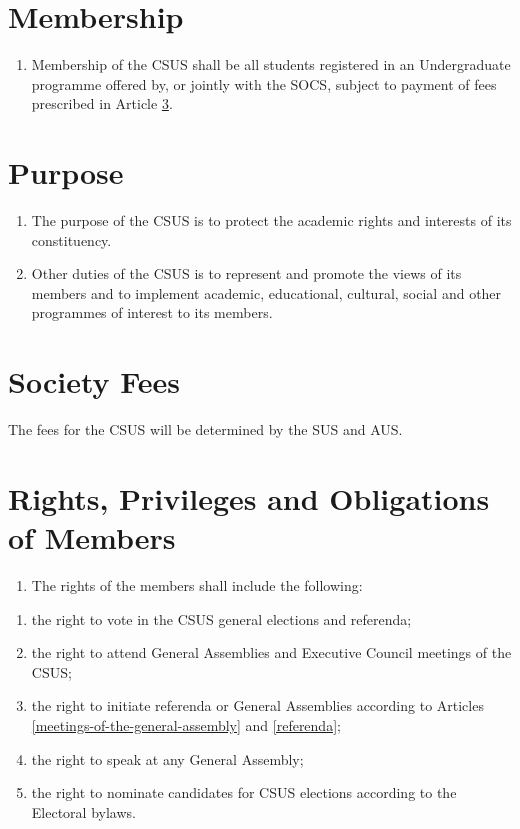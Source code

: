 \section{Membership}\label{membership}

\begin{enumerate}
\def\labelenumi{\arabic{enumi}.}
\tightlist
\item
  Membership of the CSUS shall be all students registered in an
  Undergraduate programme offered by, or jointly with the SOCS, subject
  to payment of fees prescribed in Article \ref{society-fees}.
\end{enumerate}

\section{Purpose}\label{purpose}

\begin{enumerate}
\def\labelenumi{\arabic{enumi}.}
\tightlist
\item
  The purpose of the CSUS is to protect the academic rights and
  interests of its constituency.
\item
  Other duties of the CSUS is to represent and promote the views of its
  members and to implement academic, educational, cultural, social and
  other programmes of interest to its members.
\end{enumerate}

\section{Society Fees}\label{society-fees}

The fees for the CSUS will be determined by the SUS and AUS.

\section{Rights, Privileges and Obligations of
Members}\label{rights-privileges-and-obligations-of-members}

\begin{enumerate}
\def\labelenumi{\arabic{enumi}.}
\tightlist
\item
  The rights of the members shall include the following:
\end{enumerate}

\begin{enumerate}
\def\labelenumi{(\alph{enumi})}
\item
  the right to vote in the CSUS general elections and referenda;
\item
  the right to attend General Assemblies and Executive Council meetings
  of the CSUS;
\item
  the right to initiate referenda or General Assemblies according to
  Articles \ref{meetings-of-the-general-assembly} and \ref{referenda};
\item
  the right to speak at any General Assembly;
\item
  the right to nominate candidates for CSUS elections according to the
  Electoral bylaws.
\end{enumerate}

